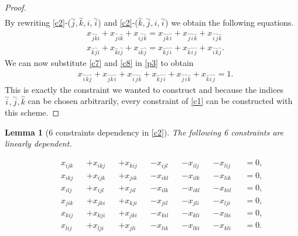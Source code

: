 \documentclass{scrartcl}
\newtheorem{lemma}{Lemma}
\theoremstyle{plain}
\begin{document}
\begin{proof}
\begin{align}
	\end{align}
	By rewriting \eqref{c2}-($\overset{\sim}{j},\overset{\sim}{k},i,\overset{\sim}{i}$) and \eqref{c2}-($\overset{\sim}{k},\overset{\sim}{j},i,\overset{\sim}{i}$) we obtain the following equations.
	\begin{align}
	&x_{\overset{\sim}{j}\overset{\sim}{k}i} + x_{\overset{\sim}{j}i\overset{\sim}{k}} + x_{i\overset{\sim}{j}\overset{\sim}{k}} = x_{\overset{\sim}{j}\overset{\sim}{k}\overset{\sim}{i}} + x_{\overset{\sim}{j}\overset{\sim}{i}\overset{\sim}{k}} + x_{\overset{\sim}{i}\overset{\sim}{j}\overset{\sim}{k}}  \label{c7}\\ 
	&x_{\overset{\sim}{k}\overset{\sim}{j}i} + x_{\overset{\sim}{k}i\overset{\sim}{j}} + x_{i\overset{\sim}{k}\overset{\sim}{j}} = x_{\overset{\sim}{k}\overset{\sim}{j}\overset{\sim}{i}} + x_{\overset{\sim}{k}\overset{\sim}{i}\overset{\sim}{j}} + x_{\overset{\sim}{i}\overset{\sim}{k}\overset{\sim}{j}}.  \label{c8}
	\end{align}
	We can now substitute \ref{c7} and \ref{c8} in \ref{p3} to obtain
	\begin{align*}
	&x_{\overset{\sim}{i}\overset{\sim}{k}\overset{\sim}{j}} + x_{\overset{\sim}{j}\overset{\sim}{k}\overset{\sim}{i}} + x_{\overset{\sim}{i}\overset{\sim}{j}\overset{\sim}{k}} + x_{\overset{\sim}{k}\overset{\sim}{j}\overset{\sim}{i}} + x_{\overset{\sim}{j}\overset{\sim}{i}\overset{\sim}{k}} + x_{\overset{\sim}{k}\overset{\sim}{i}\overset{\sim}{j}} = 1.
	\end{align*}
	This is exactly the constraint we wanted to construct and because the indices $\overset{\sim}{i},\overset{\sim}{j},\overset{\sim}{k}$ can be chosen arbitrarily, every constraint of \eqref{c1} can be constructed with this scheme.
\end{proof}


\newpage

\begin{mdframed}
\begin{lemma}[6 constraints dependency in \eqref{c2}] \label{lem6}
	The following 6 constraints are linearly dependent.
	
	\begin{align}
	& &&x_{ijk} & &+ x_{ikj} &&+ x_{kij} &&- x_{ijl} &&- x_{ilj} &&- x_{lij} &&= 0, \label{s1} \\
	& &&x_{ikj} & &+ x_{ijk} &&+ x_{jik} &&- x_{ikl} &&- x_{ilk} &&- x_{lik} &&= 0, \label{s2} \\
	& &&x_{ilj} & &+ x_{ijl} &&+ x_{jil} &&- x_{ilk} &&- x_{ikl} &&- x_{kil} &&= 0, \label{s3} \\
	& &&x_{jik} & &+ x_{jki} &&+ x_{kji} &&- x_{jil} &&- x_{jli} &&- x_{lji} &&= 0, \label{s4} \\
	& &&x_{kij} & &+ x_{kji} &&+ x_{jki} &&- x_{kil} &&- x_{kli} &&- x_{lki} &&= 0, \label{s5} \\
	& &&x_{lij} & &+ x_{lji} &&+ x_{jli} &&- x_{lik} &&- x_{lki} &&- x_{kli} &&= 0. \label{s6}
	\end{align}
\end{lemma}
\vspace{7pt}
\end{mdframed}
\end{document}
